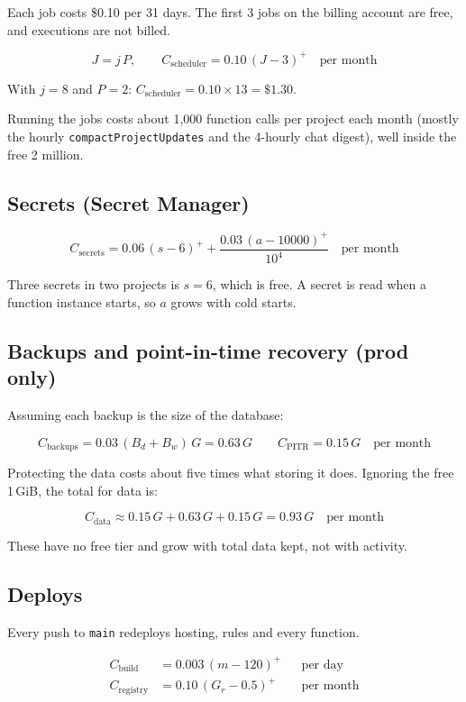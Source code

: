\documentclass{article}
\newcommand{\pos}[1]{\left(#1\right)^{+}}
\begin{document}
Each job costs \$0.10 per 31 days. The first 3 jobs on the billing account are
free, and executions are not billed.

\[
J = j\,P, \qquad
C_{\text{scheduler}} = 0.10\,\pos{J - 3} \quad \text{per month}
\]

With $j = 8$ and $P = 2$: $C_{\text{scheduler}} = 0.10 \times 13 = \$1.30$.

Running the jobs costs about 1{,}000 function calls per project each month
(mostly the hourly \texttt{compactProjectUpdates} and the 4-hourly chat
digest), well inside the free 2 million.

\subsection{Secrets (Secret Manager)}

\[
C_{\text{secrets}} = 0.06\,\pos{s - 6}
                   + \frac{0.03\,\pos{a - 10000}}{10^{4}}
                   \quad \text{per month}
\]

Three secrets in two projects is $s = 6$, which is free. A secret is read when
a function instance starts, so $a$ grows with cold starts.

\subsection{Backups and point-in-time recovery (prod only)}

Assuming each backup is the size of the database:

\[
C_{\text{backups}} = 0.03\,(B_d + B_w)\,G = 0.63\,G
\qquad
C_{\text{PITR}} = 0.15\,G
\quad \text{per month}
\]

Protecting the data costs about five times what storing it does. Ignoring the
free 1\,GiB, the total for data is:

\[
C_{\text{data}} \approx 0.15\,G + 0.63\,G + 0.15\,G = 0.93\,G
\quad \text{per month}
\]

These have no free tier and grow with total data kept, not with activity.

\subsection{Deploys}

Every push to \texttt{main} redeploys hosting, rules and every function.

\begin{align*}
C_{\text{build}} &= 0.003\,\pos{m - 120} && \text{per day} \\
C_{\text{registry}} &= 0.10\,\pos{G_r - 0.5} && \text{per month}
\end{align*}
\end{document}
